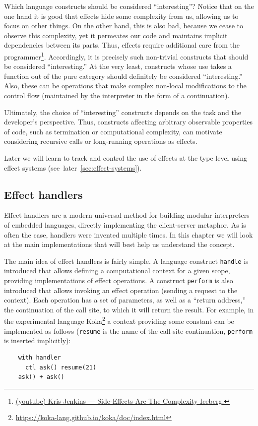 Which language constructs should be considered ``interesting''?
Notice that on the one hand it is good that effects hide some complexity from us, allowing us to focus on other things.
On the other hand, this is also bad, because we cease to observe this complexity, yet it permeates our code and maintains implicit dependencies between its parts.
Thus, effects require additional care from the programmer\footnote{\href{https://youtu.be/_nG09Z_tdUU?si=lo9It6299rsB1vAr}{(youtube) Kris Jenkins --- Side-Effects Are The Complexity Iceberg.}}.
Accordingly, it is precisely such non-trivial constructs that should be considered ``interesting.''
At the very least, constructs whose use takes a function out of the pure category should definitely be considered ``interesting.''
Also, these can be operations that make complex non-local modifications to the control flow (maintained by the interpreter in the form of a continuation).

Ultimately, the choice of ``interesting'' constructs depends on the task and the developer's perspective.
Thus, constructs affecting arbitrary observable properties of code, such as termination or computational complexity, can motivate considering recursive calls or long-running operations as effects.

Later we will learn to track and control the use of effects at the type level using effect systems (see\ later\ \ref{sec:effect-systems}).

\subsection{Effect handlers} \label{subsec:effect-handlers}

Effect handlers are a modern universal method for building modular interpreters of embedded languages, directly implementing the client-server metaphor.
As is often the case, handlers were invented multiple times.
In this chapter we will look at the main implementations that will best help us understand the concept.

The main idea of effect handlers is fairly simple.
A language construct \texttt{handle} is introduced that allows defining a computational context for a given scope, providing implementations of effect operations.
A construct \texttt{perform} is also introduced that allows invoking an effect operation (sending a request to the context).
Each operation has a set of parameters, as well as a ``return address,'' the continuation of the call site, to which it will return the result.
For example, in the experimental language Koka\footnote{\url{https://koka-lang.github.io/koka/doc/index.html}} a context providing some constant can be implemented as follows (\texttt{resume} is the name of the call-site continuation, \texttt{perform} is inserted implicitly):
\begin{verbatim}
    with handler
      ctl ask() resume(21)
    ask() + ask()
\end{verbatim}

